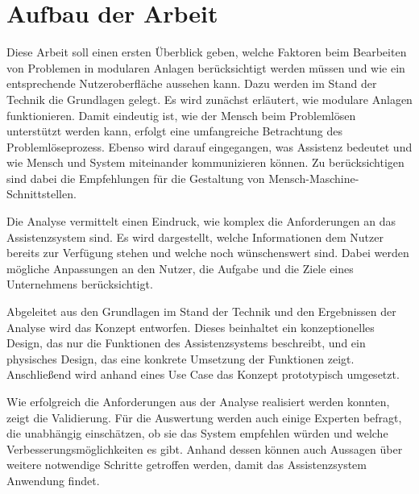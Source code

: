 \section{Aufbau der Arbeit}
Diese Arbeit soll einen ersten Überblick geben, welche Faktoren beim Bearbeiten von Problemen in modularen Anlagen berücksichtigt werden müssen und wie ein entsprechende Nutzeroberfläche aussehen kann. Dazu werden im Stand der Technik die Grundlagen gelegt. Es wird zunächst erläutert, wie modulare Anlagen funktionieren. Damit eindeutig ist, wie der Mensch beim Problemlösen unterstützt werden kann, erfolgt eine umfangreiche Betrachtung des Problemlöseprozess. Ebenso wird darauf eingegangen, was Assistenz bedeutet und wie Mensch und System miteinander kommunizieren können. Zu berücksichtigen sind dabei die Empfehlungen für die Gestaltung von Mensch-Maschine-Schnittstellen.

Die Analyse vermittelt einen Eindruck, wie komplex die Anforderungen an das Assistenzsystem sind. Es wird dargestellt, welche Informationen dem Nutzer bereits zur Verfügung stehen und welche noch wünschenswert sind. Dabei werden mögliche Anpassungen an den Nutzer, die Aufgabe und die Ziele eines Unternehmens berücksichtigt.

Abgeleitet aus den Grundlagen im Stand der Technik und den Ergebnissen der Analyse wird das Konzept entworfen. Dieses beinhaltet ein konzeptionelles Design, das nur die Funktionen des Assistenzsystems beschreibt, und ein physisches Design, das eine konkrete Umsetzung der Funktionen zeigt. Anschließend wird anhand eines Use Case das Konzept prototypisch umgesetzt.

Wie erfolgreich die Anforderungen aus der Analyse realisiert werden konnten, zeigt die Validierung. Für die Auswertung werden auch einige Experten befragt, die unabhängig einschätzen, ob sie das System empfehlen würden und welche Verbesserungsmöglichkeiten es gibt. Anhand dessen können auch Aussagen über weitere notwendige Schritte getroffen werden, damit das Assistenzsystem Anwendung findet.